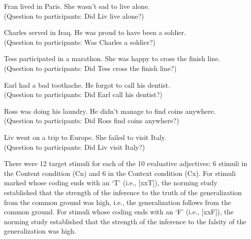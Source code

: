 \documentclass[11pt,fleqn]{article}
\newcommand{\6}{\mbox{$[\hspace*{-.6mm}[$}}
\newcommand{\9}{\mbox{$]\hspace*{-.6mm}]$}}
\begin{document}
\begin{exe}
\ex\label{control-exp1} 

\begin{xlist}

\ex Fran lived in Paris. She wasn't sad to live alone. \\ (Question to participants: Did Liv live alone?)

\ex Charles served in Iraq. He was proud to have been a soldier. \\ (Question to participants: Was Charles a soldier?)

\ex Tess participated in a marathon. She was happy to cross the finish line. \\ (Question to participants: Did Tess cross the finish line?)


\ex Earl had a bad toothache. He forgot to
call his dentist. \\ (Question to participants: Did Earl call his
dentist?)

\ex Ross was doing his laundry. He didn't manage to find coins anywhere. \\ (Question to participants: Did Ross find coins anywhere?)

\ex Liv went on a trip to Europe. She failed to visit Italy. \\
(Question to participants: Did Liv visit Italy?)

\end{xlist}
\end{exe}


There were 12 target stimuli for each of the 10 evaluative adjectives: 6 stimuli in the Content condition (Cn) and 6 in the Context condition (Cx). For stimuli marked whose coding ends with an `T' (i.e., [xxT]), the norming study established that the strength of the inference to the truth of the generalization from the common ground was high, i.e., the generalization follows from the common ground. For stimuli whose coding ends with an `F' (i.e., [xxF]), the norming study established that the strength of the inference to the falsity of the generalization was high.
\end{document}
